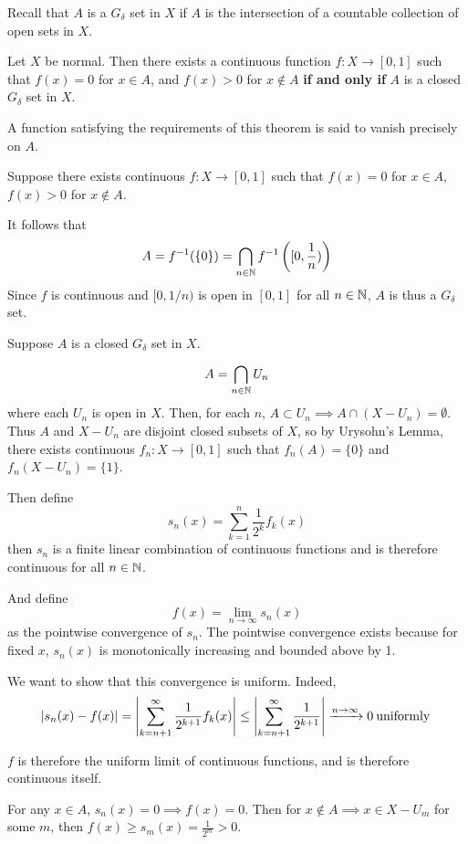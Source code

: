 \documentclass[a4paper, 10pt]{article}
\begin{document}
\begin{problem} 
    Recall that $A$ is a $G_{\delta}$ set in $X$ if $A$ is the intersection of a countable collection of open sets in $X$.

    Let $X$ be normal. Then there exists a continuous function $f: X \to [0, 1]$ such that $f(x) = 0$ for $x \in A$, and $f(x) > 0$ for $x \not \in A$ \textbf{if and only if} $A$ is a closed $G_{\delta}$ set in $X$.
    
    A function satisfying the requirements of this theorem is said to vanish precisely on $A$.
\end{problem}
\begin{solution}
    \pffwd Suppose there exists continuous $f: X \to [0, 1]$ such that $f(x) = 0$ for $x \in A$, $f(x) > 0$ for $x \not \in A$.

    It follows that \begin{equation*}
    A = \inv{f}(\{0\}) = \bigcap_{n \in \bbn} \inv{f}\left([0, \frac{1}{n})\right)
    \end{equation*}
    Since $f$ is continuous and $[0, 1/n)$ is open in $[0, 1]$ for all $n \in \bbn$, $A$ is thus a $G_\delta$ set.

    \pfbwd Suppose $A$ is a closed $G_\delta$ set in $X$.

    \begin{equation*}
    A = \bigcap_{n \in \bbn} U_n
    \end{equation*}
    where each $U_n$ is open in $X$. Then, for each $n$, $A \subset U_n \implies A \cap (X - U_n) = \emptyset$. Thus $A$ and $X - U_n$ are disjoint closed subsets of $X$, so by Urysohn's Lemma, there exists continuous $f_n: X \to [0, 1]$ such that $f_n(A) = \{0\}$ and $f_n(X - U_n) = \{1\}$.

    Then define \begin{equation*}
    s_n(x) = \sum_{k = 1}^{n} \frac{1}{2^k} f_k(x)
    \end{equation*}
    then $s_n$ is a finite linear combination of continuous functions and is therefore continuous for all $n \in \bbn$.

    And define \begin{equation*}
        f(x) = \lim_{n \to \infty} s_n(x)
    \end{equation*}
    as the pointwise convergence of $s_n$. The pointwise convergence exists because for fixed $x$, $s_n(x)$ is monotonically increasing and bounded above by 1.
    
    We want to show that this convergence is uniform. Indeed, \begin{align*}
        \abs*{s_n(x) - f(x)} = \abs*{\sum_{k = n+1}^{\infty} \frac{1}{2^{k+1}} f_k(x)} \leq \abs*{\sum_{k= n+1}^{\infty} \frac{1}{2^{k+1}}} \cvgn 0 \:\text{uniformly}\: 
    \end{align*}

    $f$ is therefore the uniform limit of continuous functions, and is therefore continuous itself.

    For any $x \in A$, $s_n(x) = 0 \implies f(x) = 0$. Then for $x \not \in A \implies x \in X - U_m$ for some $m$, then $f(x) \geq s_m(x) = \frac{1}{2^m} > 0$.
\end{solution}
\end{document}
